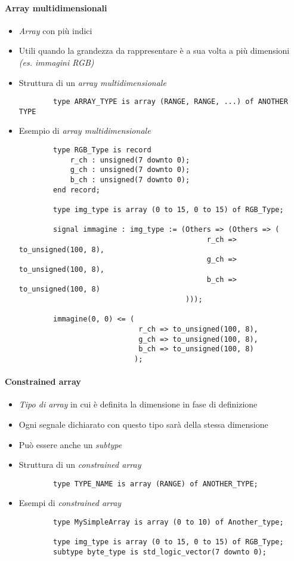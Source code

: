 \documentclass{article}
\begin{document}
\paragraph{Array multidimensionali}
\begin{itemize}
  \item \textit{Array} con più indici
  \item Utili quando la grandezza da rappresentare è a sua volta a più dimensioni \textit{(es. immagini RGB)}
  \item Struttura di un \textit{array multidimensionale}
        \begin{verbatim}
	    type ARRAY_TYPE is array (RANGE, RANGE, ...) of ANOTHER TYPE
	\end{verbatim}
  \item Esempio di \textit{array multidimensionale}
        \begin{verbatim}
	    type RGB_Type is record
	        r_ch : unsigned(7 downto 0);
	        g_ch : unsigned(7 downto 0);
	        b_ch : unsigned(7 downto 0);
	    end record;

	    type img_type is array (0 to 15, 0 to 15) of RGB_Type;

	    signal immagine : img_type := (Others => (Others => (
		                                    r_ch => to_unsigned(100, 8),
		                                    g_ch => to_unsigned(100, 8),
		                                    b_ch => to_unsigned(100, 8)
		                               )));

	    immagine(0, 0) <= (
	                        r_ch => to_unsigned(100, 8),
	                        g_ch => to_unsigned(100, 8),
	                        b_ch => to_unsigned(100, 8)
		                   );
	\end{verbatim}
\end{itemize}

\paragraph{Constrained array}
\begin{itemize}
  \item \textit{Tipo di array} in cui è definita la dimensione in fase di definizione
  \item Ogni segnale dichiarato con questo tipo sarà della stessa dimensione
  \item Può essere anche un \textit{subtype}
  \item Struttura di un \textit{constrained array}
        \begin{verbatim}
	    type TYPE_NAME is array (RANGE) of ANOTHER_TYPE;
	\end{verbatim}
  \item Esempi di \textit{constrained array}
        \begin{verbatim}
	    type MySimpleArray is array (0 to 10) of Another_type;

	    type img_type is array (0 to 15, 0 to 15) of RGB_Type;
	    subtype byte_type is std_logic_vector(7 downto 0);
	\end{verbatim}
\end{itemize}
\end{document}

